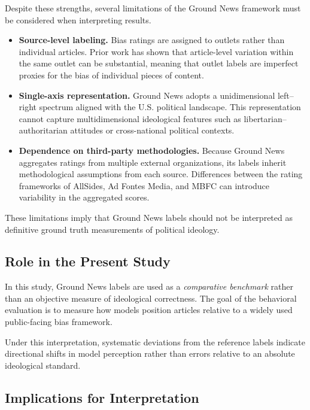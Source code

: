 \documentclass[11pt]{article}
\begin{document}
Despite these strengths, several limitations of the Ground News framework
must be considered when interpreting results.

\begin{itemize}

\item \textbf{Source-level labeling.}
Bias ratings are assigned to outlets rather than individual articles.
Prior work has shown that article-level variation within the same outlet
can be substantial, meaning that outlet labels are imperfect proxies for
the bias of individual pieces of content.

\item \textbf{Single-axis representation.}
Ground News adopts a unidimensional left–right spectrum aligned with the
U.S. political landscape. This representation cannot capture multidimensional
ideological features such as libertarian–authoritarian attitudes or
cross-national political contexts.

\item \textbf{Dependence on third-party methodologies.}
Because Ground News aggregates ratings from multiple external organizations,
its labels inherit methodological assumptions from each source. Differences
between the rating frameworks of AllSides, Ad Fontes Media, and MBFC can
introduce variability in the aggregated scores.

\end{itemize}

These limitations imply that Ground News labels should not be interpreted
as definitive ground truth measurements of political ideology.

\subsection{Role in the Present Study}

In this study, Ground News labels are used as a \textit{comparative benchmark}
rather than an objective measure of ideological correctness. The goal of the
behavioral evaluation is to measure how models position articles relative to
a widely used public-facing bias framework.

Under this interpretation, systematic deviations from the reference labels
indicate directional shifts in model perception rather than errors relative
to an absolute ideological standard.

\subsection{Implications for Interpretation}
\end{document}
